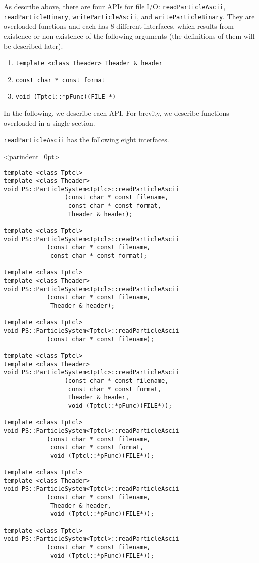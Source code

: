 As describe above, there are four APIs for file I/O: \texttt{readParticleAscii}, \texttt{readParticleBinary}, \texttt{writeParticleAscii}, and \texttt{writeParticleBinary}. They are overloaded functions and each has 8 different interfaces, which results from existence or non-existence of the following arguments (the definitions of them will be described later).
\begin{enumerate}[itemsep=-1ex,label=\arabic*)]
\item \verb|template <class Theader> Theader & header|
\item \verb|const char * const format|
\item \verb|void (Tptcl::*pFunc)(FILE *)|
\end{enumerate}
In the following, we describe each API. For brevity, we describe functions overloaded in a single section.

\label{sec:readParticleAscii}

\texttt{readParticleAscii} has the following eight interfaces.
\begin{breakitembox}<parindent=0pt>{}
\begin{verbatim}
template <class Tptcl>
template <class Theader>
void PS::ParticleSystem<Tptlc>::readParticleAscii
                 (const char * const filename,
                  const char * const format,
                  Theader & header);
                  
template <class Tptcl>
void PS::ParticleSystem<Tptcl>::readParticleAscii
            (const char * const filename,
             const char * const format);
             
template <class Tptcl>
template <class Theader>
void PS::ParticleSystem<Tptcl>::readParticleAscii
            (const char * const filename,
             Theader & header);
             
template <class Tptcl>
void PS::ParticleSystem<Tptcl>::readParticleAscii
            (const char * const filename);
            
template <class Tptcl>
template <class Theader>
void PS::ParticleSystem<Tptlc>::readParticleAscii
                 (const char * const filename,
                  const char * const format,
                  Theader & header,
                  void (Tptcl::*pFunc)(FILE*));
                  
template <class Tptcl>
void PS::ParticleSystem<Tptcl>::readParticleAscii
            (const char * const filename,
             const char * const format,
             void (Tptcl::*pFunc)(FILE*));
             
template <class Tptcl>
template <class Theader>
void PS::ParticleSystem<Tptcl>::readParticleAscii
            (const char * const filename,
             Theader & header,
             void (Tptcl::*pFunc)(FILE*));
             
template <class Tptcl>
void PS::ParticleSystem<Tptcl>::readParticleAscii
            (const char * const filename,
             void (Tptcl::*pFunc)(FILE*));
\end{verbatim}
\end{breakitembox}

